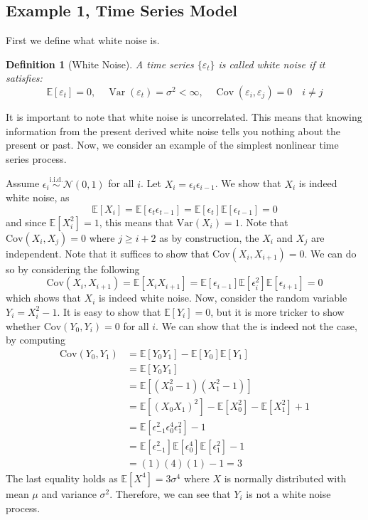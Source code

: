 \documentclass[12pt]{article}
\newtheorem{definition}{Definition}
\newcommand{\E}{\mathbb{E}}
\newcommand{\Var}{\text{Var}}
\newcommand{\Cov}{\text{Cov}}
\newcommand{\iid}{\overset{\text{i.i.d.}}{\sim}}
\begin{document}
\subsection{Example 1, Time Series Model}
First we define what white noise is. 
\begin{definition}[White Noise]
A time series $\{\varepsilon_t\}$ is called \emph{white noise} if it satisfies:
\[
\mathbb{E}[\varepsilon_t] = 0, \quad 
\operatorname{Var}(\varepsilon_t) = \sigma^2 < \infty, \quad 
\operatorname{Cov}(\varepsilon_i, \varepsilon_{j}) = 0 \quad i \neq j
\]
\end{definition}
\noindent
It is important to note that white noise is uncorrelated. This means that knowing information from the present derived white noise tells you nothing about the present or past. Now, we consider an example of the simplest nonlinear time series process.

Assume $\epsilon_i \iid \mathcal{N}(0,1)$ for all $i$. Let $X_i = \epsilon_i \epsilon_{i -1}$. We show that $X_i$ is indeed white noise, as 
\[
	\E[X_i] = \E[\epsilon_t \epsilon_{t-1}] = \E[\epsilon_t]\E[\epsilon_{t-1}] = 0
\]
and since $\E[X_i^2] = 1$, this means that $\Var(X_i) = 1$. Note that $\Cov(X_i, X_j) = 0$ where $j \geq i + 2$ as by construction, the $X_i$ and $X_j$ are independent. Note that it suffices to show that $\Cov(X_i, X_{i+1}) = 0$. We can do so by considering the following 
\[
	\Cov(X_i, X_{i+1}) = \E[X_iX_{i+1}]= \E[\epsilon_{i-1}] \E[\epsilon_i^2] \E[\epsilon_{i+1}] = 0
\]
which shows that $X_i$ is indeed white noise. Now, consider the random variable $Y_i = X_i^2 - 1$. It is easy to show that $\E[Y_i] = 0$, but it is more tricker to show whether $\Cov(Y_0, Y_i) = 0$ for all $i$. We can show that the is indeed not the case, by computing
\begin{align*}
	\Cov(Y_0, Y_1) &= \E[Y_0Y_1] - \E[Y_0]\E[Y_1] \\
		       &= \E[Y_0 Y_1]\\
		       &= \E[(X_0^2 - 1)(X_1^2 - 1)]\\
		       &= \E[(X_0X_1)^2] - \E[X_0^2] - \E[X_1^2] + 1 \\ 
		       &= \E[\epsilon_{-1}^2\epsilon_{0}^4\epsilon_1^2] - 1\\
		       &= \E[\epsilon_{-1}^2]\E[\epsilon_{0}^4]\E[\epsilon_1^2] - 1\\
		       &= (1)(4)(1) - 1 = 3
\end{align*}
The last equality holds as $\E[X^4] = 3\sigma^4$ where $X$ is normally distributed with mean $\mu$ and variance $\sigma^2$. Therefore, we can see that $Y_i$ is not a white noise process. 
\end{document}
